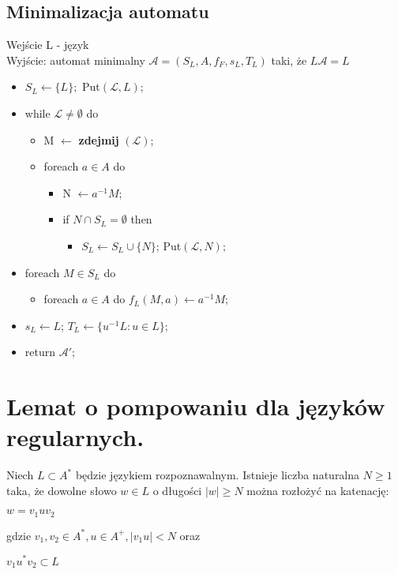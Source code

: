 \documentclass[main.tex]{subfiles}
\begin{document}
    \subsection{Minimalizacja automatu}
    Wejście L - język \\
    Wyjście: automat minimalny $\mathcal{A} = (S_L, A, f_F, s_L, T_L)$ taki, że $L\mathcal{A} = L$
    \begin{itemize}[noitemsep]
        \item $S_L \leftarrow \{L\};$ Put$(\mathcal{L}, L);$
        \item while $\mathcal{L} \neq \emptyset$ do
        \begin{itemize}[noitemsep]
            \item M $\leftarrow$ \textbf{zdejmij} $(\mathcal{L})$;
            \item foreach $a \in A$ do
            \begin{itemize}[noitemsep]
                \item N $\leftarrow a^{-1}M$;
                \item if $N \cap S_L = \emptyset$ then
                \begin{itemize}[noitemsep]
                    \item $S_L \leftarrow S_L \cup \{N\}$; Put$(\mathcal{L}, N);$
                \end{itemize}
            \end{itemize}
        \end{itemize}
        \item foreach $M \in S_L$ do
        \begin{itemize}[noitemsep]
            \item foreach $a \in A$ do $f_L(M, a) \leftarrow a^{-1}M$;
        \end{itemize}
        \item $s_L \leftarrow L$; $T_L \leftarrow \{u^{-1}L : u \in L\}$;
        \item return $\mathcal{A}'$;
    \end{itemize}


    \section{Lemat o pompowaniu dla języków regularnych.}
    \begin{definition}
        Niech $L \subset A^*$ będzie językiem rozpoznawalnym. Istnieje liczba naturalna $N \geq 1$ taka, że dowolne słowo $w \in L$ o długości $|w| \geq N$ można rozłożyć na katenację:
        \begin{center}
            $w = v_1 u v_2$
        \end{center}
        gdzie $v_1, v_2 \in A^*, u \in A^+, |v_1 u| < N$ oraz
        \begin{center}
            $v_1 u^* v_2 \subset L$
        \end{center}
    \end{definition}
\end{document}
